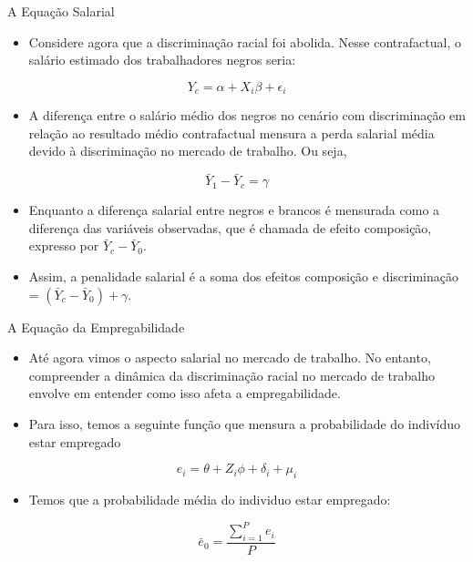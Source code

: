 \documentclass[10pt, xcolor=x11names,compress]{beamer}
\begin{document}
		
	\begin{frame}{A Equação Salarial}
	\begin{itemize}
		\item Considere agora que a discriminação racial foi abolida. Nesse contrafactual, o salário estimado dos trabalhadores negros seria:
	\end{itemize}
	\begin{equation}
		{Y}_{c} = \alpha + X_{i}\beta + \epsilon_{i}
	\end{equation}	
	\begin{itemize}
	\item A diferença entre o salário médio dos negros no cenário com discriminação em relação ao resultado médio contrafactual mensura a perda salarial média devido à discriminação no mercado de trabalho. Ou seja, 
	\end{itemize}
	\begin{equation}
	\bar{Y}_{1}  - \bar{Y}_{c}  =  \gamma
	\end{equation}	
	\begin{itemize}
	\item Enquanto a diferença salarial entre negros e brancos é mensurada como a diferença das variáveis observadas, que é chamada de efeito composição, expresso por $\bar{Y}_{c} - \bar{Y}_{0}$.
	\item Assim, a penalidade salarial é a soma dos efeitos composição e discriminação = $(\bar{Y}_{c} - \bar{Y}_{0}) + \gamma$.
	\end{itemize}
	\end{frame}
	
	\begin{frame}{A Equação da Empregabilidade}
		\begin{itemize}
			\item Até agora vimos o aspecto salarial no mercado de trabalho. No entanto, compreender a dinâmica da discriminação racial no mercado de trabalho envolve em entender como isso afeta a empregabilidade.
			\item Para isso, temos a seguinte função que mensura a probabilidade do indivíduo estar empregado
		\end{itemize}
		\begin{equation}
			e_{i} = \theta + Z_{i}\phi + \delta_{i} + \mu_{i}
		\end{equation}
		\begin{itemize}
			\item Temos que a probabilidade média do individuo estar empregado:
		\end{itemize}
		\begin{equation}
			\bar{e}_{0} = \frac{\sum_{i=1}^{P}{e}_{i}}{P}
		\end{equation}
	\end{frame}
	
\end{document}
